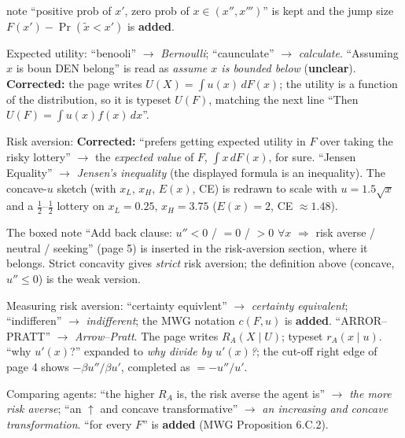 \documentclass[11pt]{article}
\begin{document}
\begin{transcriptnotes}
        note ``positive prob of $x'$, zero prob of $x\in(x'',x''')$'' is kept and the
        jump size $F(x')-\Pr(\tilde x<x')$ is \textbf{added}.
  \item Expected utility: ``benooli'' $\to$ \emph{Bernoulli}; ``caunculate'' $\to$
        \emph{calculate}. ``Assuming $x$ is boun DEN belong'' is read as \emph{assume
        $x$ is bounded below} (\textbf{unclear}). \textbf{Corrected:} the page writes
        $U(X)=\int u(x)\,dF(x)$; the utility is a function of the distribution, so it
        is typeset $U(F)$, matching the next line ``Then $U(F)=\int u(x)f(x)\,dx$''.
  \item Risk aversion: \textbf{Corrected:} ``prefers getting expected utility in $F$
        over taking the risky lottery'' $\to$ the \emph{expected value} of $F$,
        $\int x\,dF(x)$, for sure. ``Jensen Equality'' $\to$ \emph{Jensen's
        inequality} (the displayed formula is an inequality). The concave-$u$ sketch
        (with $x_L$, $x_H$, $E(x)$, CE) is redrawn to scale with $u=1.5\sqrt{x}$ and a
        $\tfrac12$--$\tfrac12$ lottery on $x_L=0.25$, $x_H=3.75$ ($E(x)=2$, CE $\approx1.48$).
  \item The boxed note ``Add back clause: $u''<0$ / $=0$ / $>0$ $\forall x$ $\Rightarrow$
        risk averse / neutral / seeking'' (page 5) is inserted in the risk-aversion
        section, where it belongs. Strict concavity gives \emph{strict} risk
        aversion; the definition above (concave, $u''\le0$) is the weak version.
  \item Measuring risk aversion: ``certainty equivlent'' $\to$ \emph{certainty
        equivalent}; ``indifferen'' $\to$ \emph{indifferent}; the MWG notation
        $c(F,u)$ is \textbf{added}. ``ARROR--PRATT'' $\to$ \emph{Arrow--Pratt}. The page
        writes $R_A(X\mid U)$; typeset $r_A(x\mid u)$. ``why $u'(x)$?'' expanded to
        \emph{why divide by $u'(x)$?}; the cut-off right edge of page 4 shows
        $-\beta u''/\beta u'$, completed as $=-u''/u'$.
  \item Comparing agents: ``the higher $R_A$ is, the risk averse the agent is'' $\to$
        \emph{the more risk averse}; ``an $\uparrow$ and concave transformative'' $\to$
        \emph{an increasing and concave transformation}. ``for every $F$'' is
        \textbf{added} (MWG Proposition 6.C.2).
\end{transcriptnotes}
\end{document}
